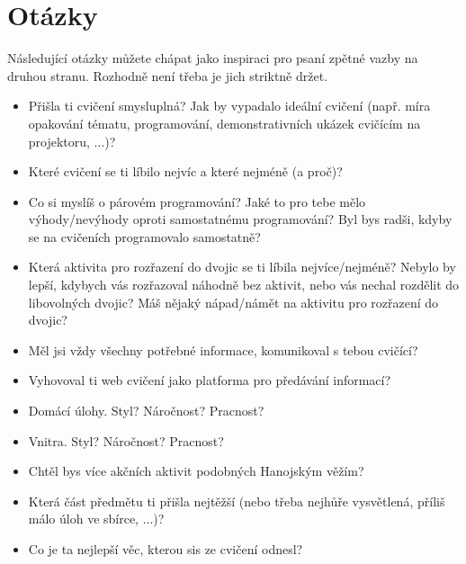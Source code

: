 \documentclass[12pt,a5paper]{article}
\begin{document}
\newpage

\section*{Otázky}

Následující otázky můžete chápat jako inspiraci pro psaní zpětné vazby na
druhou stranu. Rozhodně není třeba je jich striktně držet.

\begin{itemize}
	\item Přišla ti cvičení smysluplná? Jak by vypadalo ideální
		  cvičení (např. míra opakování tématu, programování, demonstrativních
		  ukázek cvičícím na projektoru, ...)?
	\item Které cvičení se ti líbilo nejvíc a které nejméně (a proč)?
	\item Co si myslíš o párovém programování? Jaké to pro tebe mělo
		  výhody/nevýhody oproti samostatnému programování? Byl bys radši,
		  kdyby se na cvičeních programovalo samostatně?
	\item Která aktivita pro rozřazení do dvojic se ti líbila nejvíce/nejméně?
		  Nebylo by lepší, kdybych vás rozřazoval náhodně bez aktivit, nebo vás
		  nechal rozdělit do libovolných dvojic? Máš nějaký nápad/námět na
		  aktivitu pro rozřazení do dvojic?
	\item Měl jsi vždy všechny potřebné informace, komunikoval s tebou cvičící?
	\item Vyhovoval ti web cvičení jako platforma pro předávání informací?
	\item Domácí úlohy. Styl? Náročnost? Pracnost?
	\item Vnitra. Styl? Náročnost? Pracnost?
	\item Chtěl bys více akčních aktivit podobných Hanojským věžím?
	\item Která část předmětu ti přišla nejtěžší (nebo třeba nejhůře
	      vysvětlená, příliš málo úloh ve sbírce, ...)?
	\item Co je ta nejlepší věc, kterou sis ze cvičení odnesl?
\end{itemize}
\end{document}

